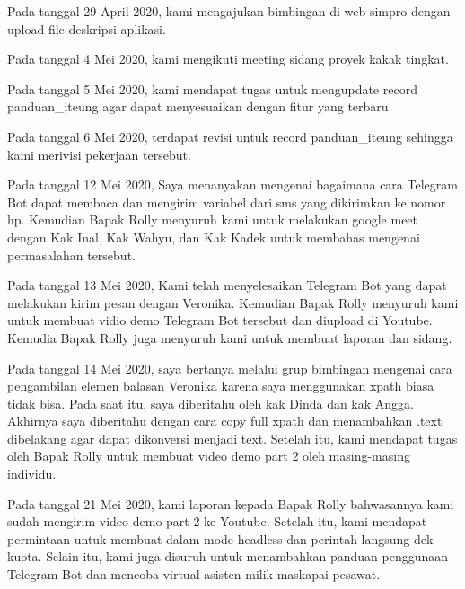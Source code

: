 \documentclass[a4paper, 12 pt]{article}
\begin{document}
            \par Pada tanggal 29 April 2020, kami mengajukan bimbingan di web simpro dengan upload file deskripsi aplikasi. \\
            
            \par Pada tanggal 4 Mei 2020, kami mengikuti meeting sidang proyek kakak tingkat. \\
            
            \par Pada tanggal 5 Mei 2020, kami mendapat tugas untuk mengupdate record panduan\_iteung agar dapat menyesuaikan dengan fitur yang terbaru. \\
            
            \par Pada tanggal 6 Mei 2020, terdapat revisi untuk record panduan\_iteung sehingga kami merivisi pekerjaan tersebut. \\
            
            \par Pada tanggal 12 Mei 2020, Saya menanyakan mengenai bagaimana cara Telegram Bot dapat membaca dan mengirim variabel dari sms yang dikirimkan ke nomor hp. Kemudian Bapak Rolly menyuruh kami untuk melakukan google meet dengan Kak Inal, Kak Wahyu, dan Kak Kadek untuk membahas mengenai permasalahan tersebut. \\
            
            \par Pada tanggal 13 Mei 2020, Kami telah menyelesaikan Telegram Bot yang dapat melakukan kirim pesan dengan Veronika. Kemudian Bapak Rolly menyuruh kami untuk membuat vidio demo Telegram Bot tersebut dan diupload di Youtube. Kemudia Bapak Rolly juga menyuruh kami untuk membuat laporan dan sidang. \\
            
            \par Pada tanggal 14 Mei 2020, saya bertanya melalui grup bimbingan mengenai cara pengambilan elemen balasan Veronika karena saya menggunakan xpath biasa tidak bisa. Pada saat itu, saya diberitahu oleh kak Dinda dan kak Angga. Akhirnya saya diberitahu dengan cara copy full xpath dan menambahkan .text dibelakang agar dapat dikonversi menjadi text. Setelah itu, kami mendapat tugas oleh Bapak Rolly untuk membuat video demo part 2 oleh masing-masing individu. \\
            
            \par Pada tanggal 21 Mei 2020, kami laporan kepada Bapak Rolly bahwasannya kami sudah mengirim video demo part 2 ke Youtube. Setelah itu, kami mendapat permintaan untuk membuat dalam mode headless dan perintah langsung dek kuota. Selain itu, kami juga disuruh untuk menambahkan panduan penggunaan Telegram Bot dan mencoba virtual asisten milik maskapai pesawat. \\
            
\end{document}
